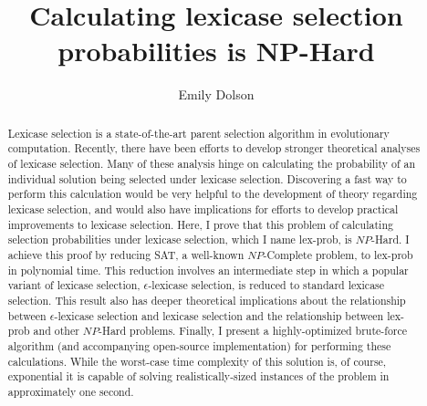 \documentclass[sigconf]{acmart}
\begin{document}
\title{Calculating lexicase selection probabilities is NP-Hard}


\author{Emily Dolson}

\renewcommand{\shortauthors}{Dolson}

\begin{abstract}
Lexicase selection is a state-of-the-art parent selection algorithm in evolutionary computation.
Recently, there have been efforts to develop stronger theoretical analyses of lexicase selection.
Many of these analysis hinge on calculating the probability of an individual solution being selected under lexicase selection. Discovering a fast way to perform this calculation would be very helpful to the development of theory regarding lexicase selection, and  would also have implications for efforts to develop practical improvements to lexicase selection. Here, I prove that this problem of calculating selection probabilities under lexicase selection, which I name {\sc lex-prob}, is $NP$-Hard. I achieve this proof by reducing {\sc SAT}, a well-known $NP$-Complete problem, to {\sc lex-prob} in polynomial time. This reduction involves an intermediate step in which a popular variant of lexicase selection, $\epsilon$-lexicase selection, is reduced to standard lexicase selection.
This result also has deeper theoretical implications about the relationship between $\epsilon$-lexicase selection and lexicase selection and the relationship between {\sc lex-prob} and other $NP$-Hard problems.
Finally, I present a highly-optimized brute-force algorithm (and accompanying open-source implementation) for performing these calculations. While the worst-case time complexity of this solution is, of course, exponential it is capable of solving realistically-sized instances of the problem in approximately one second.

%
% 
%
\end{abstract}
\end{document}
